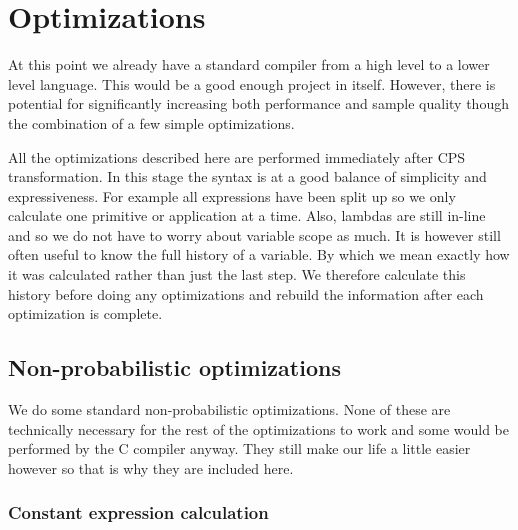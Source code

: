 \documentclass[a4paper]{article}
\begin{document}
\section{Optimizations}

At this point we already have a standard compiler from a high level to a lower level language. This would be a good enough project in itself. However, there is potential for significantly increasing both performance and sample quality though the combination of a few simple optimizations.

All the optimizations described here are performed immediately after CPS transformation. In this stage the syntax is at a good balance of simplicity and expressiveness. For example all expressions have been split up so we only calculate one primitive or application at a time. Also, lambdas are still in-line and so we do not have to worry about variable scope as much. It is however still often useful to know the full history of a variable. By which we mean exactly how it was calculated rather than just the last step. We therefore calculate this history before doing any optimizations and rebuild the information after each optimization is complete.




\subsection{Non-probabilistic optimizations}

We do some standard non-probabilistic optimizations. None of these are technically necessary for the rest of the optimizations to work and some would be performed by the C compiler anyway. They still make our life a little easier however so that is why they are included here.




\subsubsection{Constant expression calculation}
\end{document}
